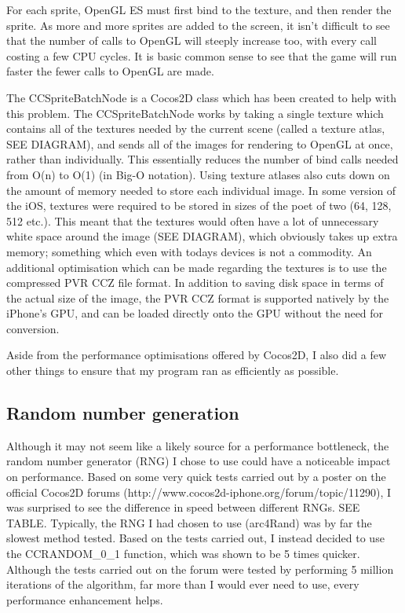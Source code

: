 \documentclass[a4paper,oneside]{report}
\begin{document}
For each sprite, OpenGL ES must first bind to the texture, and then render the sprite. As more and more sprites are added to the screen, it isn't difficult to see that the number of calls to OpenGL will steeply increase too, with every call costing a few CPU cycles. It is basic common sense to see that the game will run faster the fewer calls to OpenGL are made. 

The CCSpriteBatchNode is a Cocos2D class which has been created to help with this problem. The CCSpriteBatchNode works by taking a single texture which contains all of the textures needed by the current scene (called a texture atlas, SEE DIAGRAM), and sends all of the images for rendering to OpenGL at once, rather than individually. This essentially reduces the number of bind calls needed from O(n) to O(1) (in Big-O notation). Using texture atlases also cuts down on the amount of memory needed to store each individual image. In some version of the iOS, textures were required to be stored in sizes of the poet of two (64, 128, 512 etc.). This meant that the textures would often have a lot of unnecessary white space around the image (SEE DIAGRAM), which obviously takes up extra memory; something which even with todays devices is not a commodity. An additional optimisation which can be made regarding the textures is to use the 	compressed PVR CCZ file format. In addition to saving disk space in terms of the actual size of the image, the PVR CCZ format is supported natively by the iPhone's GPU, and can be loaded directly onto the GPU without the need for conversion.

Aside from the performance optimisations offered by Cocos2D, I also did a few other things to ensure that my program ran as efficiently as possible.

\subsection{Random number generation} Although it may not seem like a likely source for a performance bottleneck, the random number generator (RNG) I chose to use could have a noticeable impact on performance. Based on some very quick tests carried out by a poster on the official Cocos2D forums (http://www.cocos2d-iphone.org/forum/topic/11290), I was surprised to see the difference in speed between different RNGs. SEE TABLE. Typically, the RNG I had chosen to use (arc4Rand) was by far the slowest method tested. Based on the tests carried out, I instead decided to use the CCRANDOM\_0\_1 function, which was shown to be 5 times quicker. Although the tests carried out on the forum were tested by performing 5 million iterations of the algorithm, far more than I would ever need to use, every performance enhancement helps.
		
\end{document}
